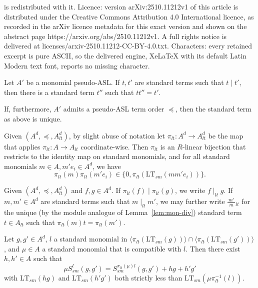 \documentclass[10pt,a4paper]{amsart}
\newcommand{\Ssm}{S_{sm}}
\newcommand{\divides}{\mid}
\newcommand{\ltdivides}{\mid_{lt}}
\newcommand{\ltfrac}[2]{\frac{\,#1\,}{\,#2\,}{}_{{\scriptscriptstyle lt}}}
\newcommand{\ltsm}{\text{LT}_{sm}}
\newcommand{\piltd}{\pi_{lt}}
\begin{document}
is redistributed with it. Licence: version arXiv:2510.11212v1 of this article is distributed under the Creative Commons Attribution 4.0 International licence, as recorded in the arXiv licence metadata for this exact version and shown on the abstract page https://arxiv.org/abs/2510.11212v1. A full rights notice is delivered at licenses/arxiv-2510.11212-CC-BY-4.0.txt. Characters: every retained excerpt is pure ASCII, so the delivered engine, XeLaTeX with its default Latin Modern text font, reports no missing character.
\begin{lemma} \label{lem:mon-div}
Let $A'$ be a monomial pseudo-ASL. If $t,t'$ are standard terms such that $t \mid t'$, then there is a standard term $t''$ such that $tt'' = t'$.

If, furthermore, $A'$ admits a pseudo-ASL term order $\preceq$, then the standard term as above is unique.
\end{lemma}

\begin{observation}[store=obsmlt, note={Module of leading terms}]
\label{obs:mlt}
Given $(A^d, \preceq, A_{lt}^d)$, by slight abuse of notation let $\piltd \colon A^d \to A_{lt}^d$ be the map that applies $\pi_{lt} \colon A \to A_{lt}$ coordinate-wise. Then $\piltd$ is an $R$-linear bijection that restricts to the identity map on standard monomials, and for all standard monomials $m \in A, m' e_i \in A^d$, we have
\[
\pi_{lt}(m) \piltd(m' e_i) \in \{0, \piltd(\ltsm(mm' e_i))\}.
\]
\end{observation}

\begin{definition} \label{def:ltdivides-modules}
Given $(A^d, \preceq, A_{lt}^d)$ and $f,g \in A^d$. If $\piltd(f) \divides \piltd(g)$, we write $f \ltdivides g$. If $m,m' \in A^d$ are standard terms such that $m \ltdivides m'$, we may further write $\ltfrac{m'}{m}$ for the unique (by the module analogue of Lemma~\ref{lem:mon-div}) standard term $t \in A_{lt}$ such that $\piltd(m)t = \piltd(m')$. 
\end{definition}

\begin{lemma} \label{lem:Ssm-prod}
Let $g,g' \in A^d$, $l$ a standard monomial in $\langle\piltd(\ltsm(g))\rangle \cap \langle \piltd(\ltsm(g'))\rangle$, and $\mu \in A$ a standard monomial that is compatible with $l$. Then there exist $h,h' \in A$ such that
\[
\mu \Ssm^{l}(g,g') = \Ssm^{\pi_{lt}(\mu) l}(g,g') + hg + h'g'
\]
with $\ltsm(hg)$ and $\ltsm(h'g')$ both strictly less than $\ltsm(\mu \pi_{lt}^{-1}(l))$.
\end{lemma}
\end{document}
